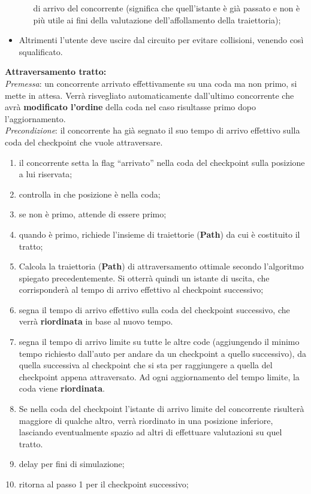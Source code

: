 \begin{description}
\begin{itemize}
\begin{itemize}
di arrivo del concorrente (significa che quell'istante è già passato e non è più utile ai fini della valutazione dell'affollamento
della traiettoria);
\end{itemize}
\item Altrimenti l'utente deve uscire dal circuito per evitare collisioni, venendo così squalificato.
\end{itemize}
\item{\textbf{Attraversamento tratto:}}\\
\emph{Premessa}: un concorrente arrivato effettivamente su una coda ma non primo, si mette in attesa. 
Verrà risvegliato automaticamente dall'ultimo concorrente che avrà \textbf{modificato l'ordine} della coda nel
caso risultasse primo dopo l'aggiornamento.\\
\emph{Precondizione}: il concorrente ha gi\`{a} segnato il suo tempo di arrivo
effettivo sulla coda del checkpoint che vuole attraversare.
\begin{enumerate}
\item il concorrente setta la flag ``arrivato'' nella coda del checkpoint sulla
posizione a lui riservata;
\item controlla in che posizione \`{e} nella coda;
\item se non \`{e} primo, attende di essere primo;
\item quando \`{e} primo, richiede l'insieme di traiettorie (\textbf{Path}) da
cui \`{e} costituito il tratto;
\item Calcola la traiettoria (\textbf{Path}) di attraversamento ottimale secondo l'algoritmo spiegato precedentemente.
Si otterrà quindi un istante di uscita, che corrisponderà al tempo di arrivo effettivo al checkpoint successivo;
\item segna il tempo di arrivo effettivo sulla coda del checkpoint successivo, che verr\`{a}
\textbf{riordinata} in base al nuovo tempo.
\item segna il tempo di arrivo limite su tutte le altre code (aggiungendo il minimo tempo richiesto dall'auto
per andare da un checkpoint a quello successivo), da quella
successiva al checkpoint che si sta per raggiungere a quella del checkpoint
appena attraversato. Ad ogni aggiornamento del tempo limite, la coda viene
\textbf{riordinata}.
\item Se nella coda del checkpoint l'istante di arrivo limite del concorrente risulterà maggiore di qualche altro, 
verrà riordinato in una posizione inferiore, lasciando eventualmente spazio
ad altri di effettuare valutazioni su quel tratto.
\item delay per fini di simulazione;
\item ritorna al passo 1 per il checkpoint successivo;
\end{enumerate}
\end{description}
